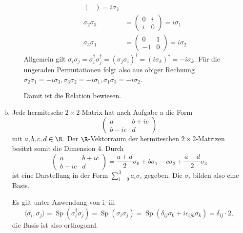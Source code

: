 \documentclass{article}
\begin{document}
\begin{enumerate}[(a)]
\begin{enumerate}[i.]
\begin{align*}
\begin{pmatrix}
                \end{pmatrix} = i\sigma_3\\
                \sigma_2 \sigma_3 &= \begin{pmatrix}
                    0 & i\\
                    i & 0
                \end{pmatrix} = i \sigma_1\\
                \sigma_3\sigma_1 &= \begin{pmatrix}
                    0 & 1\\
                    -1 & 0
                \end{pmatrix} = i \sigma_2
            \end{align*}
            Allgemein gilt $\sigma_i \sigma_j = \sigma_i^\dagger \sigma_j^\dagger = (\sigma_j\sigma_i)^\dagger = (i\sigma_k)^\dagger = - i \sigma_k$.
            Für die ungeraden Permutationen folgt also aus obiger Rechnung $\sigma_2\sigma_1 = -i\sigma_3, \sigma_3\sigma_2 = -i\sigma_1, \sigma_1 \sigma_3 = -i\sigma_2$.

            Damit ist die Relation bewiesen.
        \end{enumerate} 
        \item Jede hermitesche $2\times 2$-Matrix hat nach Aufgabe a die Form
        \[
            \begin{pmatrix}
                a & b + ic\\
                b - ic & d
            \end{pmatrix} 
        \] mit $a,b,c,d \in \R$.
        Der $\R$-Vektorraum der hermiteschen $2\times 2$-Matrizen besitzt somit die Dimension 4. Durch
        \[
            \begin{pmatrix}
                a & b + ic\\
                b - ic & d
            \end{pmatrix} = \frac{a+d}{2}\sigma_0  + b \sigma_1 - c \sigma_2 +  \frac{a-d}{2}\sigma_3 
        \]
        ist eine Darstellung in der Form $\sum_{i = 0}^{3} a_i \sigma_i$ gegeben. Die $\sigma_i$ bilden also eine Basis.

        Es gilt unter Anwendung von i.-iii.
        \[
            \langle \sigma_i, \sigma_j \rangle = \operatorname{Sp}(\sigma_i^\dagger \sigma_j) = \operatorname{Sp}(\sigma_i \sigma_j) = \operatorname{Sp}(\delta_{ij}\sigma_0 + i \epsilon_{ijk} \sigma_k) = \delta_{ij} \cdot 2,
        \]
        die Basis ist also orthogonal.
    \end{enumerate}
\end{document}
